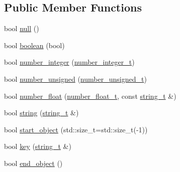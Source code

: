 \subsection*{Public Member Functions}
\begin{DoxyCompactItemize}
\item 
bool \mbox{\hyperlink{classnlohmann_1_1detail_1_1json__sax__acceptor_ad7ad55168af6e03ed8b844c94a17b9ce}{null}} ()
\item 
bool \mbox{\hyperlink{classnlohmann_1_1detail_1_1json__sax__acceptor_a3f5fe42a9b195de8d251d6d98d5ee92c}{boolean}} (bool)
\item 
bool \mbox{\hyperlink{classnlohmann_1_1detail_1_1json__sax__acceptor_a976bf4ce6e9a2ffe48f683ddff80af00}{number\+\_\+integer}} (\mbox{\hyperlink{classnlohmann_1_1detail_1_1json__sax__acceptor_a41876b17c0e8bdb55580eaf5e4e2ded8}{number\+\_\+integer\+\_\+t}})
\item 
bool \mbox{\hyperlink{classnlohmann_1_1detail_1_1json__sax__acceptor_ad15b288f3351287edbe289502f595491}{number\+\_\+unsigned}} (\mbox{\hyperlink{classnlohmann_1_1detail_1_1json__sax__acceptor_ae07454608ea6f3cfb765f95e3c850043}{number\+\_\+unsigned\+\_\+t}})
\item 
bool \mbox{\hyperlink{classnlohmann_1_1detail_1_1json__sax__acceptor_aebf8800023eb20d472f111f86b189e60}{number\+\_\+float}} (\mbox{\hyperlink{classnlohmann_1_1detail_1_1json__sax__acceptor_a5502f483fc60a1bcd73e0e46b6ab36e4}{number\+\_\+float\+\_\+t}}, const \mbox{\hyperlink{classnlohmann_1_1detail_1_1json__sax__acceptor_a3a8078bbf865ec355106f6048241609a}{string\+\_\+t}} \&)
\item 
bool \mbox{\hyperlink{classnlohmann_1_1detail_1_1json__sax__acceptor_aaa69255e757a6ecc4403a2aa4931fc60}{string}} (\mbox{\hyperlink{classnlohmann_1_1detail_1_1json__sax__acceptor_a3a8078bbf865ec355106f6048241609a}{string\+\_\+t}} \&)
\item 
bool \mbox{\hyperlink{classnlohmann_1_1detail_1_1json__sax__acceptor_a822bbca11a9fea0aa337018e351755f5}{start\+\_\+object}} (std\+::size\+\_\+t=std\+::size\+\_\+t(-\/1))
\item 
bool \mbox{\hyperlink{classnlohmann_1_1detail_1_1json__sax__acceptor_a59e1ea5e9c8d25346a564bf9287a5c2a}{key}} (\mbox{\hyperlink{classnlohmann_1_1detail_1_1json__sax__acceptor_a3a8078bbf865ec355106f6048241609a}{string\+\_\+t}} \&)
\item 
bool \mbox{\hyperlink{classnlohmann_1_1detail_1_1json__sax__acceptor_a919645fd1827a561a994d70a435e3f19}{end\+\_\+object}} ()
\item 

\end{DoxyCompactItemize}
